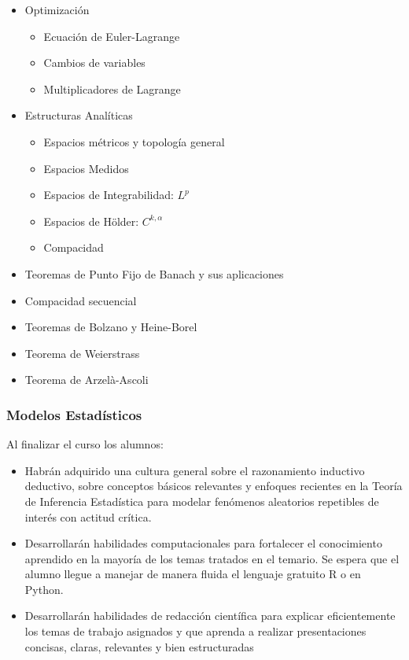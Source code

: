 \documentclass[10pt,a4paper]{article}
\begin{document}
\begin{itemize}
\begin{itemize}
    \end{itemize}
    \item Optimización
    \begin{itemize}
        \item Ecuación de Euler-Lagrange
        \item Cambios de variables
        \item Multiplicadores de Lagrange
    \end{itemize}
    \item Estructuras Analíticas
    \begin{itemize}
        \item Espacios métricos y topología general
        \item Espacios Medidos
        \item Espacios de Integrabilidad: \( L^p \)
        \item Espacios de Hölder: \( C^{k,\alpha} \)
        \item Compacidad
    \end{itemize}
    \item Teoremas de Punto Fijo de Banach y sus aplicaciones
    \item Compacidad secuencial
    \item Teoremas de Bolzano y Heine-Borel
    \item Teorema de Weierstrass
    \item Teorema de Arzelà-Ascoli
\end{itemize}

\subsubsection{Modelos Estadísticos}

Al finalizar el curso los alumnos:
\begin{itemize}
	\item Habrán adquirido una cultura general sobre el razonamiento inductivo deductivo, sobre conceptos básicos relevantes y enfoques recientes en la Teoría de Inferencia Estadística para modelar fenómenos aleatorios repetibles de interés con actitud crítica.
	\item Desarrollarán habilidades computacionales para fortalecer el conocimiento aprendido en la mayoría de los temas tratados en el temario. Se espera que el alumno llegue a manejar de manera fluida el lenguaje gratuito R o en Python.
	\item Desarrollarán habilidades de redacción científica para explicar eficientemente los temas de trabajo asignados y que aprenda a realizar presentaciones concisas, claras, relevantes y bien estructuradas
\end{itemize}
\end{document}
